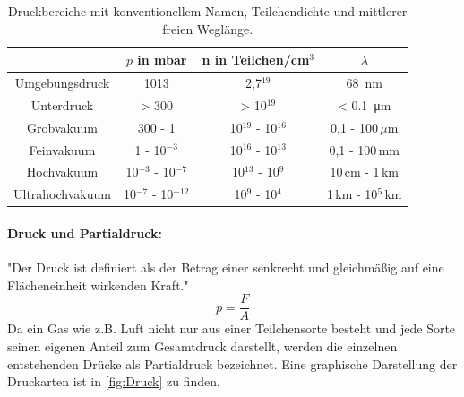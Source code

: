 \begin{table}
  \centering
  \caption{Druckbereiche mit konventionellem Namen, Teilchendichte und mittlerer freien Weglänge.}
  \label{tab:Vakuum}
  \begin{tabular}{cccc}
    \toprule
    &$p$ in mbar & n in Teilchen/cm$^3$ & $\lambda$ \\
    \midrule
    Umgebungsdruck & 1013 & 2,7\cdot10$^{19}$ & \SI{68}{\nano\meter} \\
    Unterdruck & > 300 & > 10$^{19}$ & < \SI{0.1}{\micro\meter} \\
    Grobvakuum & 300 - 1 & 10$^{19}$ - 10$^{16}$ & 0,1 - 100$\,\mu$m \\
    Feinvakuum & 1 - 10$^{-3}$ & 10$^{16}$ - 10$^{13}$ & 0,1 - 100$\,$mm \\
    Hochvakuum & 10$^{-3}$ - 10$^{-7}$ & 10$^{13}$ - 10$^{9}$ & 10$\,$cm - 1$\,$km \\
    Ultrahochvakuum & 10$^{-7}$ - 10$^{-12}$ & 10$^{9}$ - 10$^{4}$ & 1$\,$km - 10$^5\,$km \\
  \end{tabular}
  \label{tab:Vakuum}
\end{table}

\paragraph{Druck und Partialdruck:}
"Der Druck ist definiert als der Betrag einer senkrecht und gleichmäßig auf eine Flächeneinheit wirkenden Kraft."\cite{pfeiffer}
\begin{equation}
  p = \frac{F}{A}
\end{equation}
Da ein Gas wie z.B. Luft nicht nur aus einer Teilchensorte besteht und jede Sorte seinen eigenen Anteil zum Gesamtdruck darstellt, werden
die einzelnen entstehenden Drücke als Partialdruck bezeichnet. Eine graphische Darstellung der Druckarten ist in \ref{fig:Druck} zu finden.

